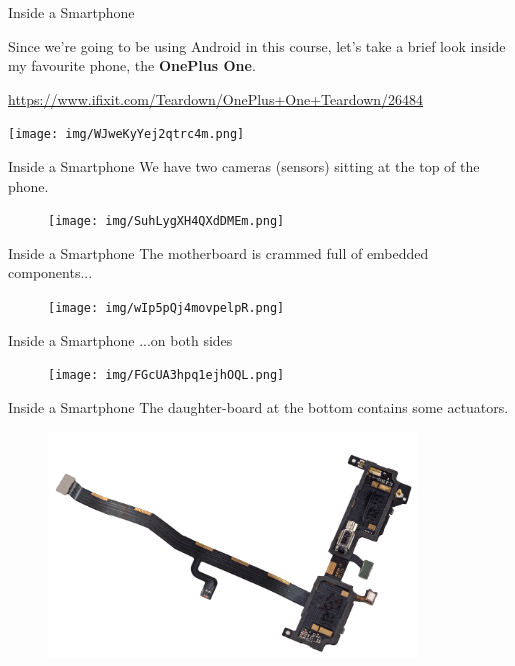 \documentclass{beamer}
\begin{document}
	\begin{frame}{Inside a Smartphone}
		
		Since we're going to be using Android in this course, let's take a brief look
		inside my favourite phone, the {\bf OnePlus One}.
		
		\href{https://www.ifixit.com/Teardown/OnePlus+One+Teardown/26484}{https://www.ifixit.com/Teardown/OnePlus+One+Teardown/26484}
		
		\vspace{1em}		
		
		\centering
		\texttt{[image: img/WJweKyYej2qtrc4m.png]}
			
	\end{frame}
	
	\begin{frame}{Inside a Smartphone}
		We have two cameras (sensors) sitting at the top of the phone.
		\begin{figure}[b]		
		\centering
		\texttt{[image: img/SuhLygXH4QXdDMEm.png]}
		\end{figure}
	\end{frame}
  
	\begin{frame}{Inside a Smartphone}
		The motherboard is crammed full of embedded components...
		\begin{figure}[b]
		\centering
		\texttt{[image: img/wIp5pQj4movpelpR.png]}
		\end{figure}
	\end{frame}  
	
	\begin{frame}{Inside a Smartphone}
		...on both sides
		\begin{figure}[b]
		\centering
		\texttt{[image: img/FGcUA3hpq1ejhOQL.png]}
		\end{figure}
	\end{frame}
  
	\begin{frame}{Inside a Smartphone}
		The daughter-board at the bottom contains some actuators.
		\begin{figure}[b]
		\centering
		\includegraphics[width=\textwidth,height=6cm,keepaspectratio]{img/wdnGHA1UB3lBpZIL.png}
		\end{figure}
	\end{frame}    
	
\end{document}
